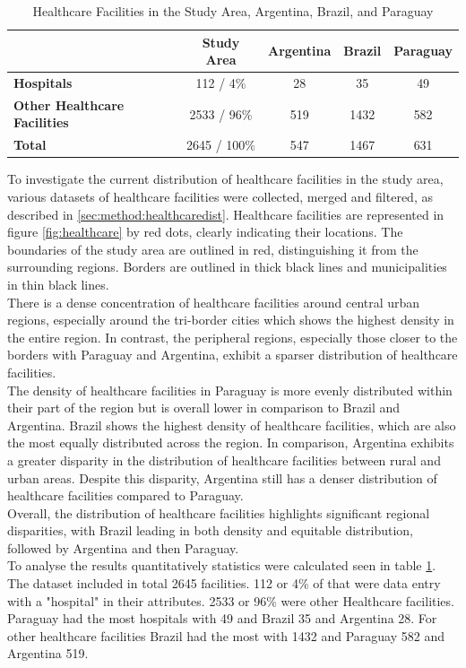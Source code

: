 \documentclass[11pt, a4paper]{report}
\begin{document}
\begin{table}[h!]
\caption{Healthcare Facilities in the Study Area, Argentina, Brazil, and Paraguay}
\centering
\begin{tabular}{|l|c|c|c|c|}
\hline
\textbf{} & \textbf{Study Area} & \textbf{Argentina} & \textbf{Brazil} & \textbf{Paraguay} \\ 
\hline
\textbf{Hospitals } & 112 / 4\%  & 28 & 35 & 49 \\ 
\hline
\textbf{Other Healthcare Facilities } & 2533 / 96\% & 519 & 1432 & 582 \\ 
\hline
\textbf{Total} & 2645 / 100\% & 547 & 1467 & 631 \\
\hline
\end{tabular}
\label{table:healthcare_facilities}
\end{table}

To investigate the current distribution of healthcare facilities in the study area, various datasets of healthcare facilities were collected, merged and filtered, as described in \ref{sec:method:healthcaredist}. Healthcare facilities are represented in figure \ref{fig:healthcare} by red dots, clearly indicating their locations. The boundaries of the study area are outlined in red, distinguishing it from the surrounding regions. Borders are outlined in thick black lines and municipalities in thin black lines. \\
%
There is a dense concentration of healthcare facilities around central urban regions, especially around the tri-border cities which shows the highest density in the entire region. In contrast, the peripheral regions, especially those closer to the borders with Paraguay and Argentina, exhibit a sparser distribution of healthcare facilities. \\
%
The density of healthcare facilities in Paraguay is more evenly distributed within their part of the region but is overall lower in comparison to Brazil and Argentina. Brazil shows the highest density of healthcare facilities, which are also the most equally distributed across the region. In comparison, Argentina exhibits a greater disparity in the distribution of healthcare facilities between rural and urban areas. Despite this disparity, Argentina still has a denser distribution of healthcare facilities compared to Paraguay. \\
% 
Overall, the distribution of healthcare facilities highlights significant regional disparities, with Brazil leading in both density and equitable distribution, followed by Argentina and then Paraguay. \\
%
To analyse the results quantitatively statistics were calculated seen in table \ref{table:healthcare_facilities}. The dataset included in total 2645 facilities. 112 or 4\% of that were data entry with a "hospital" in their attributes. 2533 or 96\% were other Healthcare facilities. Paraguay had the most hospitals with 49 and Brazil 35 and Argentina 28. For other healthcare facilities Brazil had the most with 1432 and Paraguay 582 and Argentina 519. 
\end{document}
